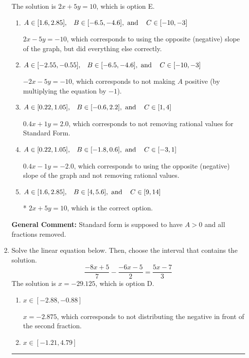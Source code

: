 \documentclass{extbook}[14pt]
\newcommand{\litem}[1]{\item #1

\rule{\textwidth}{0.4pt}}
\begin{document}
\begin{enumerate}
{The solution is \( 2x + 5y = 10 \), which is option E.\begin{enumerate}[label=\Alph*.]
\item \( A \in [1.6, 2.85], \hspace{3mm} B \in [-6.5, -4.6], \text{ and } \hspace{3mm} C \in [-10, -3] \)

 $2x - 5y = -10$, which corresponds to using the opposite (negative) slope of the graph, but did everything else correctly.
\item \( A \in [-2.55, -0.55], \hspace{3mm} B \in [-6.5, -4.6], \text{ and } \hspace{3mm} C \in [-10, -3] \)

 $-2x - 5y = -10$, which corresponds to not making $A$ positive (by multiplying the equation by $-1$).
\item \( A \in [0.22, 1.05], \hspace{3mm} B \in [-0.6, 2.2], \text{ and } \hspace{3mm} C \in [1, 4] \)

 $0.4x + 1y = 2.0$, which corresponds to not removing rational values for Standard Form.
\item \( A \in [0.22, 1.05], \hspace{3mm} B \in [-1.8, 0.6], \text{ and } \hspace{3mm} C \in [-3, 1] \)

 $0.4x - 1y = -2.0$, which corresponds to using the opposite (negative) slope of the graph and not removing rational values.
\item \( A \in [1.6, 2.85], \hspace{3mm} B \in [4, 5.6], \text{ and } \hspace{3mm} C \in [9, 14] \)

* $2x + 5y = 10$, which is the correct option.
\end{enumerate}

\textbf{General Comment:} Standard form is supposed to have $A > 0$ and all fractions removed.
}
\litem{
Solve the linear equation below. Then, choose the interval that contains the solution.
\[ \frac{-8x + 5}{7} - \frac{-6x -5}{2} = \frac{5x -7}{3} \]The solution is \( x = -29.125 \), which is option D.\begin{enumerate}[label=\Alph*.]
\item \( x \in [-2.88, -0.88] \)

 $x = -2.875$, which corresponds to not distributing the negative in front of the second fraction.
\item \( x \in [-1.21, 4.79] \)


\end{enumerate}}
\end{enumerate}
\end{document}
